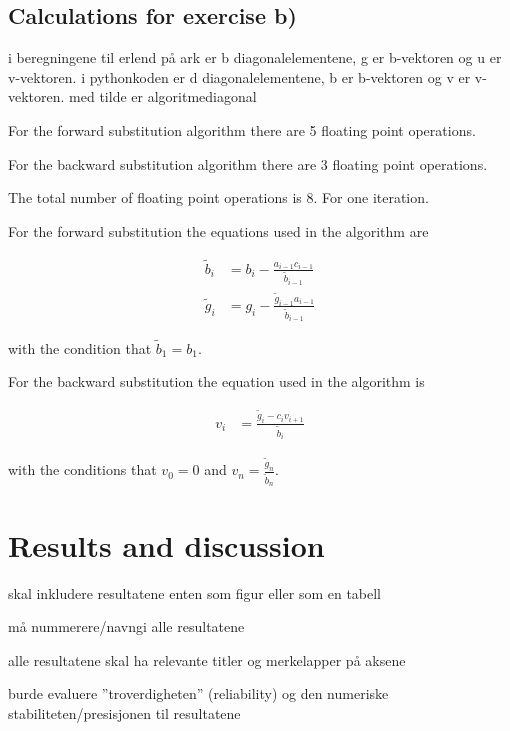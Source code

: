 \documentclass{article}
\begin{document}
  \subsection{Calculations for exercise b)}


    i beregningene til erlend på ark er b diagonalelementene, g er b-vektoren og u er v-vektoren. i pythonkoden er d diagonalelementene, b er b-vektoren og v er v-vektoren. med tilde er algoritmediagonal

    For the forward substitution algorithm there are 5 floating point operations.

    For the backward substitution algorithm there are 3 floating point operations.

    The total number of floating point operations is 8. For one iteration.

    For the forward substitution the equations used in the algorithm are

    \begin{align*}
      \tilde{b}_i &= b_i - \frac{a_{i-1} c_{i-1}}{\tilde{b} _{i-1}} \\
      \tilde{g}_i &= g_i - \frac{\tilde{g}_{i-1} a_{i-1}}{\tilde{b}_{i-1}}
    \end{align*}

    with the condition that $\tilde{b}_1 = b_1$.

    For the backward substitution the equation used in the algorithm is

    \begin{align*}
      v_i &= \frac{\tilde{g}_i - c_i v_{i+1}}{\tilde{b}_i}
    \end{align*}

    with the conditions that $v_0 = 0$ and $v_n = \frac{\tilde{g}_n}{\tilde{b}_n}$.


\vspace{1cm}

\section{Results and discussion}

  skal inkludere resultatene enten som figur eller som en tabell

  må nummerere/navngi alle resultatene

  alle resultatene skal ha relevante titler og merkelapper på aksene

  burde evaluere ''troverdigheten'' (reliability) og den numeriske stabiliteten/presisjonen til resultatene
\end{document}
